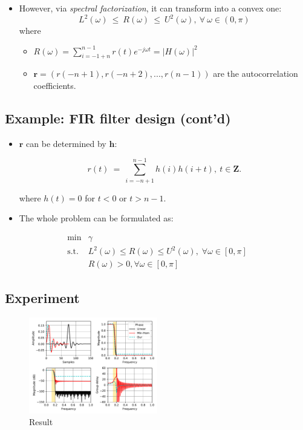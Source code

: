 \documentclass[]{article}
\providecommand{\tightlist}{%
  \setlength{\itemsep}{0pt}\setlength{\parskip}{0pt}}
\begin{document}
\begin{itemize}
\tightlist
\item
  However, via \emph{spectral factorization}, it can transform into a
  convex one:
  \[L^2(\omega)~\leq~R(\omega)~\leq~U^2(\omega),~\forall~\omega\in(0,\pi)\]
  where

  \begin{itemize}
  \tightlist
  \item
    \(R(\omega)=\sum_{i=-1+n}^{n-1}{r(t)e^{-j{\omega}t}}=|H(\omega)|^2\)
  \item
    \(\mathbf{r}=(r(-n+1),r(-n+2),...,r(n-1))\) are the autocorrelation
    coefficients.
  \end{itemize}
\end{itemize}

\hypertarget{example-fir-filter-design-contd-2}{%
\subsection{Example: FIR filter design
(cont'd)}\label{example-fir-filter-design-contd-2}}

\begin{itemize}
\item
  \(\mathbf{r}\) can be determined by \(\mathbf{h}\):

  \[r(t)~=~\sum_{i=-n+1}^{n-1}{h(i)h(i+t)},~t\in\mathbf{Z}.\]

  where \(h(t)=0\) for \(t < 0\) or \(t > n - 1\).
\item
  The whole problem can be formulated as:
\end{itemize}

\[\begin{array}{ll}
  \text{min}  & \gamma \\
  \text{s.t.} & L^2(\omega) \leq R(\omega) \leq U^2(\omega), \; \forall \omega \in [0,\pi]   \\
              & R(\omega) > 0, \forall \omega \in [0,\pi]
\end{array}\]

\hypertarget{experiment}{%
\subsection{Experiment}\label{experiment}}

\begin{figure}
\centering
\includegraphics[width=0.5\textwidth,height=\textheight]{ellipsoid.files/lowpass.pdf}
\caption{Result}
\end{figure}
\end{document}
